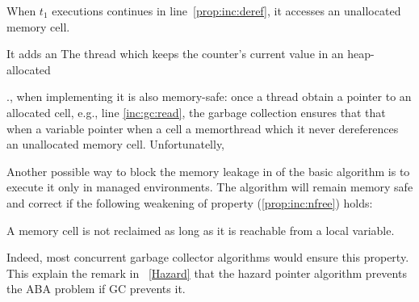 When  $t_1$ executions continues in line~\ref{prop:inc:deref}, it accesses an unallocated memory cell.    







It adds an  
The thread which  
keeps the counter's current value in an heap-allocated


., when implementing  it is also memory-safe:
once a thread obtain a pointer to an allocated cell, e.g., line \ref{inc:gc:read},    
the garbage collection ensures that that when a variable pointer when a cell a memorthread which it never dereferences an unallocated memory cell.
Unfortunatelly,

\begin{remark}
Another possible way to block the memory leakage in of the basic algorithm is to execute it only 
in managed environments. 
The algorithm will remain memory safe and correct if the following
weakening of property (\ref{prop:inc:nfree}) holds:
\begin{property}\label{prop:simple:gc}
A memory cell is not reclaimed as long as it is reachable from 
a local variable.
\end{property}
Indeed, most concurrent garbage collector algorithms would ensure this property.
This explain the remark in ~\ref{Hazard} that the hazard pointer algorithm prevents the ABA problem if 
GC prevents it.
\TODO{} 
\end{remark}

